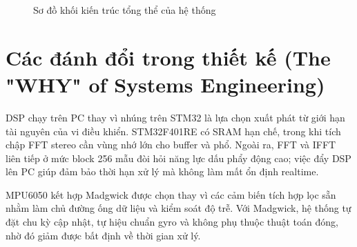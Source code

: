 \begin{figure}[H]
\centering
{}
\caption{Sơ đồ khối kiến trúc tổng thể của hệ thống}
\label{fig:system_architecture}
\end{figure}

\section{Các đánh đổi trong thiết kế (The "WHY" of Systems Engineering)}
DSP chạy trên PC thay vì nhúng trên STM32 là lựa chọn xuất phát từ giới hạn tài nguyên của vi điều khiển. STM32F401RE có SRAM hạn chế, trong khi tích chập FFT stereo cần vùng nhớ lớn cho buffer và phổ. Ngoài ra, FFT và IFFT liên tiếp ở mức block 256 mẫu đòi hỏi năng lực dấu phẩy động cao; việc đẩy DSP lên PC giúp đảm bảo thời hạn xử lý mà không làm mất ổn định realtime.

MPU6050 kết hợp Madgwick được chọn thay vì các cảm biến tích hợp lọc sẵn nhằm làm chủ đường ống dữ liệu và kiểm soát độ trễ. Với Madgwick, hệ thống tự đặt chu kỳ cập nhật, tự hiệu chuẩn gyro và không phụ thuộc thuật toán đóng, nhờ đó giảm được bất định về thời gian xử lý.

